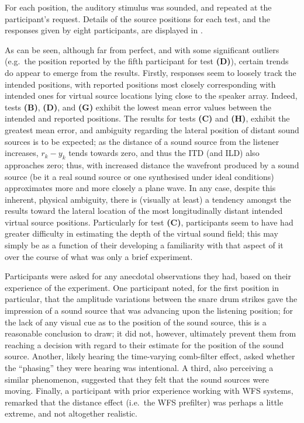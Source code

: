 For each position, the auditory stimulus was sounded, and repeated at the
participant's request.
Details of the source positions for each test, and the responses given by
eight participants, are displayed in .

As can be seen, although far from perfect, and with some significant
outliers (e.g.\ the position reported by the fifth participant for test
\textbf{(D)}), certain trends do appear to emerge from the results.
Firstly, responses seem to loosely track the intended positions, with reported
positions most closely corresponding with intended ones for virtual source
locations lying close to the speaker array.
Indeed, tests \textbf{(B)}, \textbf{(D)}, and \textbf{(G)} exhibit the lowest
mean error values between the intended and reported positions.
The results for tests \textbf{(C)} and \textbf{(H)}, exhibit the greatest mean
error, and ambiguity regarding the lateral position of distant sound sources is
to be expected;
as the distance of a sound source from the listener increases, $r_k - y_k$
tends towards zero, and thus the ITD (and ILD) also approaches zero;
thus, with increased distance the wavefront produced by a sound source (be it a
real sound source or one synthesised under ideal conditions) approximates more
and more closely a plane wave.
In any case, despite this inherent, physical ambiguity, there is (visually
at least) a tendency amongst the results toward the lateral location of the
most longitudinally distant intended virtual source positions.
Particularly for test \textbf{(C)}, participants seem to have had greater
difficulty in estimating the depth of the virtual sound field; this may simply
be as a function of their developing a familiarity with that aspect of it over
the course of what was only a brief experiment.

Participants were asked for any anecdotal observations they had, based on their
experience of the experiment.
One participant noted, for the first position in particular, that the amplitude
variations between the snare drum strikes gave the impression of a sound source
that was advancing upon the listening position; for the lack of any visual cue
as to the position of the sound source, this is a reasonable conclusion to draw;
it did not, however, ultimately prevent them from reaching a decision with
regard to their estimate for the position of the sound source.
Another, likely hearing the time-varying comb-filter effect, asked whether the
``phasing'' they were hearing was intentional.
A third, also perceiving a similar phenomenon, suggested that they
felt that the sound sources were moving.
Finally, a participant with prior experience working with WFS systems, remarked
that the distance effect (i.e.\ the WFS prefilter) was perhaps a little extreme,
and not altogether realistic.

